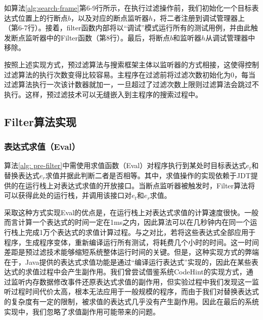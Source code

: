 如算法\ref{alg:search-frame}第6-9行所示，在执行过滤操作前，我们初始化一个目标表达式位置上的行断点$b$，以及对应的断点监听器$h$，将二者注册到调试管理器上（第6-7行）。接着，filter函数内部将以“调试”模式运行所有的测试用例，并由此触发断点监听器中的Filter函数（第8行）。最后，将断点$b$和监听器$h$从调试管理器中移除。

按照上述实现方式，预过滤算法与搜索框架主体以监听器的方式相接，这使得控制过滤算法的执行次数变得比较容易。主程序在过滤前将过滤次数初始化为0，每当过滤算法执行一次该计数器就加一，一旦超过了过滤次数上限则过滤算法会跳过不执行。这样，预过滤技术可以无缝嵌入到主程序的搜索过程中。

\subsection{Filter算法实现}

\subsubsection{表达式求值（Eval）}
算法\ref{alg: pre-filter}中需使用求值函数（Eval）对程序执行到某处时目标表达式$e_t$和替换表达式$e_r$求值并据此判断二者是否相等。其中，求值操作的实现依赖于JDT提供的在运行栈上对表达式求值的开放接口。当断点监听器被触发时，Filter算法将可以获得此处的运行栈，并调用该接口对$e_t$和$e_r$求值。

采取这种方式实现Eval的优点是，在运行栈上对表达式求值的计算速度很快。一般而言计算一个表达式的时间一定在1ms之内，因此算法可以在几秒钟内在同一个运行栈上完成1万个表达式的求值计算过程。与之对比，若将这些表达式全部应用于程序，生成程序变体，重新编译运行所有测试，将耗费几个小时的时间。这一时间差距是预过滤技术能够缩短系统整体运行时间的关键。但是，这种实现方式的弊端在于，Java提供的表达式求值功能是通过“编译运行表达式”实现的，因此在某些表达式的求值过程中会产生副作用。我们曾尝试借鉴系统CodeHint\cite{Galenson:2014:CDI:2568225.2568250}的实现方式，通过监听内存数据修改事件还原表达式求值的副作用，但实验过程中我们发现这一监听过程时间代价太高，根本无法应用于一般规模的程序，而由于我们对替换表达式的复杂度有一定的限制，被求值的表达式几乎没有产生副作用。因此在最后的系统实现中，我们忽略了求值副作用可能带来的问题。


